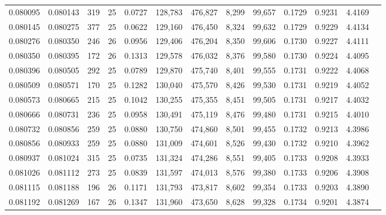 \begin{tabular}{rrrrrrrrrrrrr}
0.080095 & 0.080143 & 319 &  25 &                                     0.0727 & 128,783 & 476,827 &   8,299 &  99,657 & 0.1729 & 0.9231 & 4.4169 \\
0.080145 & 0.080275 & 377 &  25 &                                     0.0622 & 129,160 & 476,450 &   8,324 &  99,632 & 0.1729 & 0.9229 & 4.4134 \\
0.080276 & 0.080350 & 246 &  26 &                                     0.0956 & 129,406 & 476,204 &   8,350 &  99,606 & 0.1730 & 0.9227 & 4.4111 \\
0.080350 & 0.080395 & 172 &  26 &                                     0.1313 & 129,578 & 476,032 &   8,376 &  99,580 & 0.1730 & 0.9224 & 4.4095 \\
0.080396 & 0.080505 & 292 &  25 &                                     0.0789 & 129,870 & 475,740 &   8,401 &  99,555 & 0.1731 & 0.9222 & 4.4068 \\
0.080509 & 0.080571 & 170 &  25 &                                     0.1282 & 130,040 & 475,570 &   8,426 &  99,530 & 0.1731 & 0.9219 & 4.4052 \\
0.080573 & 0.080665 & 215 &  25 &                                     0.1042 & 130,255 & 475,355 &   8,451 &  99,505 & 0.1731 & 0.9217 & 4.4032 \\
0.080666 & 0.080731 & 236 &  25 &                                     0.0958 & 130,491 & 475,119 &   8,476 &  99,480 & 0.1731 & 0.9215 & 4.4010 \\
0.080732 & 0.080856 & 259 &  25 &                                     0.0880 & 130,750 & 474,860 &   8,501 &  99,455 & 0.1732 & 0.9213 & 4.3986 \\
0.080856 & 0.080933 & 259 &  25 &                                     0.0880 & 131,009 & 474,601 &   8,526 &  99,430 & 0.1732 & 0.9210 & 4.3962 \\
0.080937 & 0.081024 & 315 &  25 &                                     0.0735 & 131,324 & 474,286 &   8,551 &  99,405 & 0.1733 & 0.9208 & 4.3933 \\
0.081026 & 0.081112 & 273 &  25 &                                     0.0839 & 131,597 & 474,013 &   8,576 &  99,380 & 0.1733 & 0.9206 & 4.3908 \\
0.081115 & 0.081188 & 196 &  26 &                                     0.1171 & 131,793 & 473,817 &   8,602 &  99,354 & 0.1733 & 0.9203 & 4.3890 \\
0.081192 & 0.081269 & 167 &  26 &                                     0.1347 & 131,960 & 473,650 &   8,628 &  99,328 & 0.1734 & 0.9201 & 4.3874 \\

\end{tabular}
